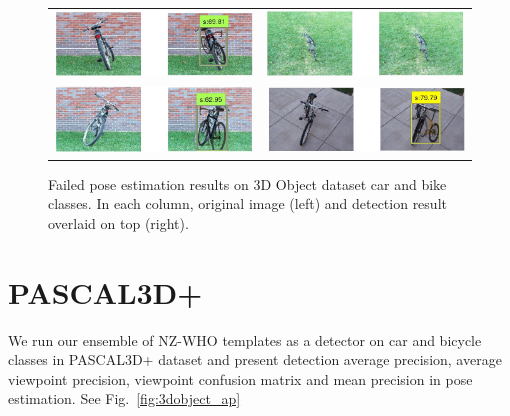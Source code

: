\documentclass[10pt,twocolumn,letterpaper]{article}
\begin{document}
\begin{figure}[h]
\setlength\tabcolsep{1pt}
\centering
\begin{tabular}{|c|c|}
\hline 
  \includegraphics[width=0.40\linewidth]{supp/bicycle1.png} &
  \includegraphics[width=0.40\linewidth]{supp/bicycle5.png} \\
  \includegraphics[width=0.40\linewidth]{supp/bicycle19.png} &
  \includegraphics[width=0.40\linewidth]{supp/bicycle20.png} \\
\hline
\end{tabular}
\caption{Failed pose estimation results on 3D Object dataset car and bike
classes. In each column, original image (left) and detection result overlaid on
top (right).}%
  \label{fig:3dobject_bicycle_bad}
\end{figure}



\section{PASCAL3D+}

We run our ensemble of NZ-WHO templates as a detector on car
and bicycle classes in PASCAL3D+ dataset  \cite{Xiang14} and present detection average precision,
average viewpoint precision, viewpoint confusion matrix and mean precision in
pose estimation. See Fig.~\ref{fig:3dobject_ap}
\end{document}
